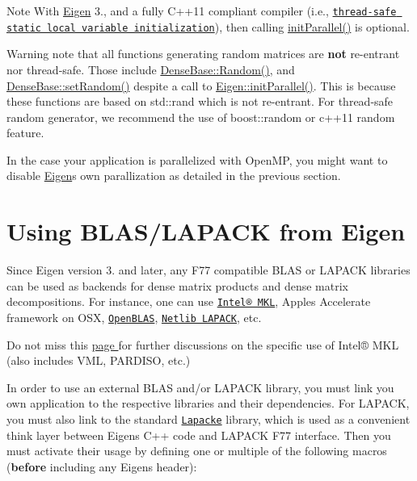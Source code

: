 \begin{DoxyNote}{Note}
With \hyperlink{namespace_eigen}{Eigen} 3., and a fully C++11 compliant compiler (i.\+e., \href{http://en.cppreference.com/w/cpp/language/storage_duration#Static_local_variables}{\tt thread-\/safe static local variable initialization}), then calling {\ttfamily \hyperlink{namespace_eigen_a820c0e0460934cc17eb6dacbad54a9f5}{init\+Parallel()}} is optional.
\end{DoxyNote}
\begin{DoxyWarning}{Warning}
note that all functions generating random matrices are {\bfseries not} re-\/entrant nor thread-\/safe. Those include \hyperlink{group___core___module_ae814abb451b48ed872819192dc188c19}{Dense\+Base\+::\+Random()}, and \hyperlink{group___core___module_ac476e5852129ba32beaa1a8a3d7ee0db}{Dense\+Base\+::set\+Random()} despite a call to \hyperlink{namespace_eigen_a820c0e0460934cc17eb6dacbad54a9f5}{Eigen\+::init\+Parallel()}. This is because these functions are based on std\+::rand which is not re-\/entrant. For thread-\/safe random generator, we recommend the use of boost\+::random or c++11 random feature.
\end{DoxyWarning}
In the case your application is parallelized with Open\+MP, you might want to disable \hyperlink{namespace_eigen}{Eigen}\textquotesingle{}s own parallization as detailed in the previous section. \hypertarget{TopicUsingBlasLapack}{}\section{Using B\+L\+A\+S/\+L\+A\+P\+A\+CK from Eigen}\label{TopicUsingBlasLapack}
Since Eigen version 3. and later, any F77 compatible B\+L\+AS or L\+A\+P\+A\+CK libraries can be used as backends for dense matrix products and dense matrix decompositions. For instance, one can use \href{http://eigen.tuxfamily.org/Counter/redirect_to_mkl.php}{\tt Intel® M\+KL}, Apple\textquotesingle{}s Accelerate framework on O\+SX, \href{http://www.openblas.net/}{\tt Open\+B\+L\+AS}, \href{http://www.netlib.org/lapack}{\tt Netlib L\+A\+P\+A\+CK}, etc.

Do not miss this \hyperlink{_topic_using_intel_m_k_l}{page } for further discussions on the specific use of Intel® M\+KL (also includes V\+ML, P\+A\+R\+D\+I\+SO, etc.)

In order to use an external B\+L\+AS and/or L\+A\+P\+A\+CK library, you must link you own application to the respective libraries and their dependencies. For L\+A\+P\+A\+CK, you must also link to the standard \href{http://www.netlib.org/lapack/lapacke.html}{\tt Lapacke} library, which is used as a convenient think layer between Eigen\textquotesingle{}s C++ code and L\+A\+P\+A\+CK F77 interface. Then you must activate their usage by defining one or multiple of the following macros ({\bfseries before} including any Eigen\textquotesingle{}s header)\+:

